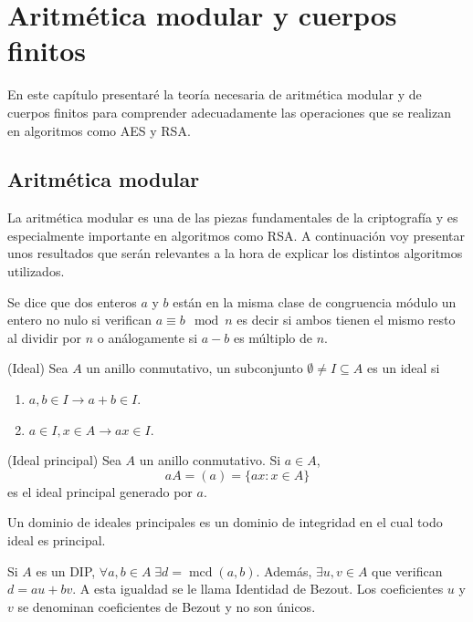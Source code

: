 \chapter{Aritmética modular y cuerpos finitos}
En este capítulo presentaré la teoría necesaria de aritmética modular y de cuerpos finitos para comprender adecuadamente las operaciones que se realizan en algoritmos como AES y RSA.

\section{Aritmética modular}
La aritmética modular es una de las piezas fundamentales de la criptografía y es especialmente importante en algoritmos como RSA. A continuación voy presentar unos resultados  que serán relevantes a la hora de explicar los distintos algoritmos utilizados.
\begin{definicion}
	Se dice que dos enteros $a$ y $b$ están en la misma clase de congruencia módulo un entero no nulo si verifican $a \equiv b \mod n$ es decir si ambos tienen el mismo resto al dividir por $n$ o análogamente si $a-b$ es múltiplo de $n$.
\end{definicion}
\begin{definicion}
	(Ideal) Sea $A$ un anillo conmutativo, un subconjunto $\emptyset \neq I \subseteq A$ es un ideal si
	\begin{enumerate}
		\item $a, b \in I \rightarrow a+b \in I$.
		\item $a\in I,x\in A \rightarrow ax\in I$.
	\end{enumerate}
\end{definicion}
\begin{definicion}
	(Ideal principal) Sea $A$ un anillo conmutativo. Si $a\in A$,
	$$
		aA = (a) = \{ax:x\in A\}
	$$
	es el ideal principal generado por $a$.
\end{definicion}
\begin{definicion}
	Un dominio de ideales principales es un dominio de integridad en el cual todo ideal es principal.
\end{definicion}
\begin{teorema}
		Si $A$ es un DIP, $\forall a,b\in A\; \exists d = \operatorname{mcd}(a,b)$. Además, $\exists u,v \in A$ que verifican $d=au+bv$. A esta igualdad se le llama Identidad de Bezout. Los coeficientes $u$ y $v$ se denominan coeficientes de Bezout y no son únicos.
\end{teorema}
